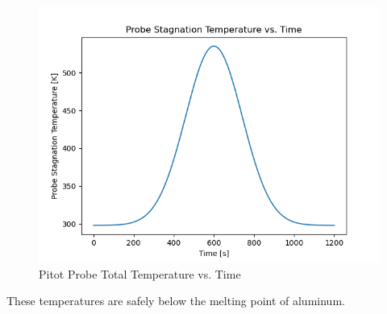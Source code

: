\documentclass[../main.tex]{subfiles}
\begin{document}
\begin{figure}[h]
    \centering
    \includegraphics[scale=.7]{../images/problem_2/Probe_T_t_vs_Time_F16.png}
    \caption{Pitot Probe Total Temperature vs. Time}
    \label{Probe_temp}
\end{figure}

These temperatures are safely below the melting point of aluminum.
\end{document}
